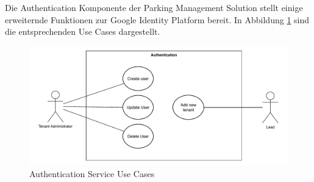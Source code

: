 Die Authentication Komponente der Parking Management Solution stellt einige erweiternde Funktionen zur Google Identity Platform bereit. In Abbildung \ref{fig:auth-use-cases} sind die entsprechenden Use Cases dargestellt.


\begin{figure}[H]
    \centering
    \includegraphics[width=\textwidth]{resources/auth-use-cases.pdf}
    \caption{Authentication Service Use Cases}
    \label{fig:auth-use-cases}
\end{figure}
